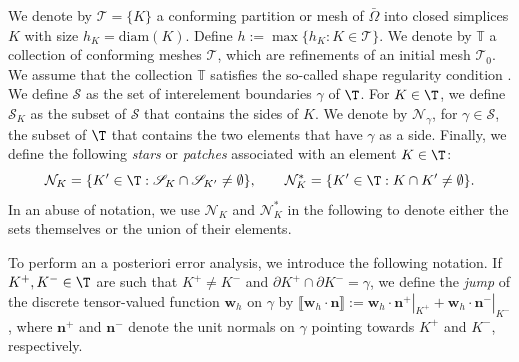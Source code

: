\documentclass[final]{siamart0216}
\begin{document}
We denote by $\mathscr{T} = \{ K\}$ a conforming partition or mesh of $\bar{\Omega}$ into closed simplices $K$ with size $h_K = \text{diam}(K)$. Define $h:=\max \{ h_K: K \in \mathscr{T} \}$. We denote by $\mathbb{T}$ a collection of conforming meshes $\mathscr{T}$, which are refinements of an initial mesh $\mathscr{T}_0$. We assume that the collection $\mathbb{T}$ satisfies the so-called shape regularity condition \cite{MR2373954,CiarletBook,Guermond-Ern}. We define $\mathscr{S}$ as the set of interelement boundaries $\gamma$ of $\T$. For $K \in \T$, we define $\mathscr{S}_K$ as the subset of $\mathscr{S}$ that contains the sides of $K$. We denote by $\mathcal{N}_{\gamma}$, for $\gamma \in \mathscr{S}$, the subset of $\T$ that contains the two elements that have $\gamma$ as a side. Finally, we define the following \emph{stars} or \emph{patches} associated with an element $K \in \T$:
\begin{equation}
\label{eq:patch}
\mathcal{N}_K=  \{K' \in \T: \mathscr{S}_K \cap \mathscr{S}_{K'} \neq \emptyset \},
\qquad 
\mathcal{N}_K^*= \{K' \in \T: K \cap {K'} \neq \emptyset \}.
\end{equation}
In an abuse of notation, we use $\mathcal{N}_K$ and $\mathcal{N}_K^*$ in the following to denote either the sets themselves or the union of their elements.

To perform an a posteriori error analysis, we introduce the following notation. If $K^{+}, K^{-} \in \T$ are such that $K^{+} \neq K^{-}$ and $\partial K^{+} \cap \partial K^{-} = \gamma$, we define the \emph{jump} of the discrete tensor-valued function $\mathbf{w}_{h}$ on $\gamma$ by $\llbracket \mathbf{w}_{h} \cdot \mathbf{n} \rrbracket:= \mathbf{w}_{h} \cdot \mathbf{n}^{+} |^{}_{K^{+}} + \mathbf{w}_{h} \cdot \mathbf{n}^{-}  |^{}_{K^{-}}$, where $\mathbf{n}^{+}$ and $\mathbf{n}^{-}$ denote the unit normals on $\gamma$ pointing towards $K^{+}$ and $K^{-}$, respectively.
\end{document}
